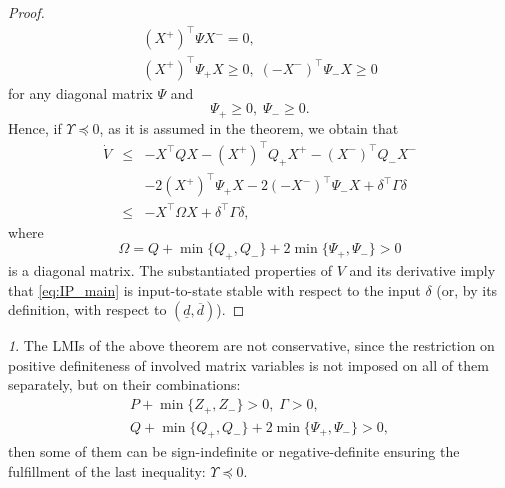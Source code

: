 \documentclass[letterpaper, 10 pt, conference]{ieeeconf}
\theoremstyle{plain}
\theoremstyle{definition}
\theoremstyle{plain}
\theoremstyle{plain}
\theoremstyle{remark}
\newtheorem{rem}{\protect\remarkname}
\providecommand{\remarkname}{Remark}
\begin{document}
\begin{proof}
\begin{gather*}
(X^{+})^{\top}\Psi X^{-}=0,\\
(X^{+})^{\top}\Psi_{+}X\geq0,\;(-X^{-})^{\top}\Psi_{-}X\geq0
\end{gather*}
for any diagonal matrix $\Psi$ and
\[
\Psi_{+}\geq0,\;\Psi_{-}\geq0.
\]
Hence, if $\Upsilon\preceq0$, as it is assumed in the theorem, we obtain that
\begin{eqnarray*}
\dot{V} & \leq & -X^{\top}QX-(X^{+})^{\top}Q_{+}X^{+}-(X^{-})^{\top}Q_{-}X^{-}\\
 &  & -2(X^{+})^{\top}\Psi_{+}X-2(-X^{-})^{\top}\Psi_{-}X+\delta^{\top}\Gamma\delta\\
 & \leq & -X^{\top}\Omega X+\delta^{\top}\Gamma\delta,
\end{eqnarray*}
where
\[
\Omega=Q+\min\{Q_{+},Q_{-}\}+2\min\{\Psi_{+},\Psi_{-}\}>0
\]
is a diagonal matrix. The substantiated properties of $V$ and its derivative imply that \eqref{eq:IP_main} is input-to-state stable \cite{Khalil2002} with respect to the input $\delta$ (or, by its definition, with respect to $(\underline{d},\overline{d})$).
\end{proof}
\begin{rem}
The LMIs of the above theorem are not conservative, since the restriction on positive definiteness of involved matrix variables is not imposed on all of them separately, but on their combinations:
\begin{gather*}
P+\min\{Z_{+},Z_{-}\}>0,\;\Gamma>0,\\
Q+\min\{Q_{+},Q_{-}\}+2\min\{\Psi_{+},\Psi_{-}\}>0,
\end{gather*}
then some of them can be sign-indefinite or negative-definite ensuring the fulfillment of the last inequality:
$
\Upsilon\preceq0.
$
\end{rem}
\end{document}
